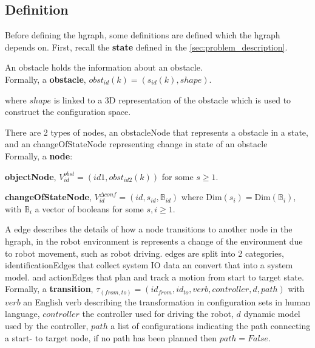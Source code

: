 \subsection{Definition}
\label{subsec:hgraph_definition}
Before defining the \ac{hgraph}, some definitions are defined which the \ac{hgraph} depends on. First, recall the \textbf{state} defined in the \cref{sec:problem_description}.\bs

An obstacle holds the information about an obstacle.\\Formally, a \textbf{obstacle},  $obst_{id}(k) = (s_{id}(k), shape)$.\bs

where $shape$ is linked to a 3D representation of the obstacle which is used to construct the configuration space.\bs

There are 2 types of nodes, an obstacleNode that represents a obstacle in a state, and an changeOfStateNode representing change in state of an obstacle\\Formally, a \textbf{node}:\bs

\textbf{objectNode}, $V^{obst}_{id} =(id1, obst_{id2}(k))$ for some $s \geq 1$.\\

\textbf{changeOfStateNode}, $V^{\Delta conf}_{id} = (id, s_{id}, \mathbb{B}_{id})$ where $\textrm{Dim}(s_{i})=\textrm{Dim}(\mathbb{B}_i)$, with $\mathbb{B}_i$ a vector of booleans for some $s,i \geq 1$.\bs

A edge describes the details of how a node transitions to another node in the \ac{hgraph}, in the robot environment is represents a change of the environment due to robot movement, such as robot driving. edges are split into 2 categories, identificationEdges that collect system \ac{IO} data an convert that into a system model. and actionEdges that plan and track a motion from start to target state. \\

Formally, a \textbf{transition}, $\tau_{(from, to)} = (id_{from}, id_{to}, verb, controller, d, path)$ with $verb$ an English verb describing the transformation in configuration sets in human language, $controller$ the controller used for driving the robot, $d$ dynamic model used by the controller, $path$ a list of configurations indicating the path connecting a start- to target node, if no path has been planned then $path = False$.\\


